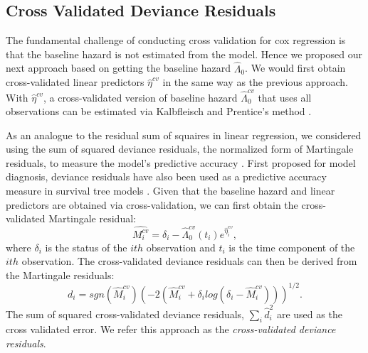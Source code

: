   \subsection{Cross Validated Deviance Residuals}

The fundamental challenge of conducting cross validation for cox regression is that the baseline hazard is not estimated from the model. Hence we proposed our next approach based on getting the baseline hazard $\hat{\Lambda}_{0}$. We would first obtain cross-validated linear predictors $\hat{\eta}^{cv}$ in the same way as the previous approach. With $\hat{\eta}^{cv}$,  a cross-validated version of baseline hazard $\hat{\Lambda}^{cv}_{0}$ that uses all observations can be estimated via Kalbfleisch and Prentice's method \citep{Kalbfleisch2011}.

As an analogue to the residual sum of squaires in linear regression, we considered using the sum of squared deviance residuals, the normalized form of Martingale residuals, to measure the model's predictive accuracy \citep{Therneau1990}. First proposed for model diagnosis, deviance residuals have also been used as a predictive accuracy measure in survival tree models \citep{Therneau2018}. Given that the baseline hazard and linear predictors are obtained via cross-validation, we can first obtain the cross-validated Martingale residual: 
	\begin{equation}
	\hat{M^{cv}_{i}} = \delta_{i} -\hat{\Lambda}^{cv}_{0}(t_{i})e^{\hat{\eta}^{cv}_{i}},
	\end{equation} 
where $\delta_{i}$ is the status of the $ith$ observation and $t_{i}$ is the time component of the $ith$ observation. The cross-validated deviance residuals can then be derived from the Martingale residuals: 
	\begin{equation} 
	d_{i} = sgn(\hat{M}^{cv}_{i})(-2(\hat{M}^{cv}_{i} + \delta_{i}log(\delta_{i} - \hat{M}^{cv}_{i})))^{1/2}.
	\end{equation}
The sum of squared cross-validated deviance residuals, $\sum_{i}\hat{d}_{i}^2$ are used as the cross validated error. We refer this approach as the \emph{cross-validated deviance residuals}.

